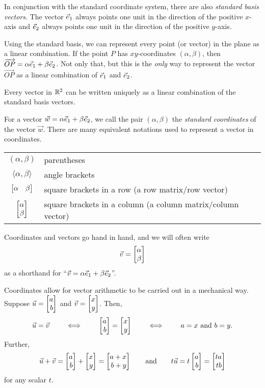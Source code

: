 In conjunction with the standard coordinate system, there are also \emph{standard basis vectors}.
The vector ${\vec e_1}$ always points one unit in the direction of the positive $x$-axis and ${\vec e_2}$
always points one unit in the direction of the positive $y$-axis.

Using the standard basis, we can represent every point (or vector) in the plane 
as a linear combination. If the point $P$ has $xy$-coordinates $(\alpha,\beta)$, then
$\overrightarrow{OP}=\alpha{\vec e_1}+\beta{\vec e_2}$. Not only that, but this is the
\emph{only} way to represent the vector $\overrightarrow{OP}$ as a linear combination of
${\vec e_1}$ and ${\vec e_2}$.

\begin{emphbox}[Takeaway]
	Every vector in $\mathbb{R}^2$ can be written uniquely as a linear combination of the standard basis vectors.
\end{emphbox}

For a vector $\vec w=\alpha{\vec e_1}+\beta{\vec e_2}$,
we call the pair $(\alpha,\beta)$  the
\emph{standard coordinates} of the vector $\vec w$.  There
are many equivalent notations used to represent a vector in coordinates.
\begin{center}
	\begin{tabular}{c p{7cm}}
		$(\alpha,\beta)$ & parentheses\\
		$\langle \alpha,\beta\rangle$ & angle brackets\\
		$\mat{\alpha&\beta}$ & square brackets in a row (a row matrix/row vector)\\
		$\mat{\alpha\\\beta}$ & square brackets in a column (a column matrix/column vector)\\
	\end{tabular}
\end{center}

Coordinates and vectors go hand in hand, and we will often write
\[
	\vec v=\mat{\alpha\\\beta}
\]
as a shorthand for ``$\vec v=\alpha{\vec e_1}+\beta{\vec e_2}$''.


Coordinates allow for vector arithmetic to be carried out in a mechanical way.
 Suppose $\vec u=\mat{a\\b}$ and $\vec v=\mat{x\\y}$.
Then,
\[
	\vec u=\vec v\qquad\iff\qquad \mat{a\\b}=\mat{x\\y}\qquad\iff\qquad a=x\text{ and }b=y.
\]
Further,
\[
	\vec u+\vec v=\mat{a\\b}+\mat{x\\y}=\mat{a+x\\b+y}\qquad\text{and}\qquad t\vec u=t\mat{a\\b}=\mat{ta\\tb}
\]
for any scalar $t$.

